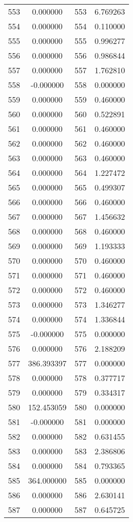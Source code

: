 \documentclass[12pt]{article}
\begin{document}
\begin{longtable}{@{}cccc@{}}
553 & 0.000000 & 553 & 6.769263 \\
554 & 0.000000 & 554 & 0.110000 \\
555 & 0.000000 & 555 & 0.996277 \\
556 & 0.000000 & 556 & 0.986844 \\
557 & 0.000000 & 557 & 1.762810 \\
558 & -0.000000 & 558 & 0.000000 \\
559 & 0.000000 & 559 & 0.460000 \\
560 & 0.000000 & 560 & 0.522891 \\
561 & 0.000000 & 561 & 0.460000 \\
562 & 0.000000 & 562 & 0.460000 \\
563 & 0.000000 & 563 & 0.460000 \\
564 & 0.000000 & 564 & 1.227472 \\
565 & 0.000000 & 565 & 0.499307 \\
566 & 0.000000 & 566 & 0.460000 \\
567 & 0.000000 & 567 & 1.456632 \\
568 & 0.000000 & 568 & 0.460000 \\
569 & 0.000000 & 569 & 1.193333 \\
570 & 0.000000 & 570 & 0.460000 \\
571 & 0.000000 & 571 & 0.460000 \\
572 & 0.000000 & 572 & 0.460000 \\
573 & 0.000000 & 573 & 1.346277 \\
574 & 0.000000 & 574 & 1.336844 \\
575 & -0.000000 & 575 & 0.000000 \\
576 & 0.000000 & 576 & 2.188209 \\
577 & 386.393397 & 577 & 0.000000 \\
578 & 0.000000 & 578 & 0.377717 \\
579 & 0.000000 & 579 & 0.334317 \\
580 & 152.453059 & 580 & 0.000000 \\
581 & -0.000000 & 581 & 0.000000 \\
582 & 0.000000 & 582 & 0.631455 \\
583 & 0.000000 & 583 & 2.386806 \\
584 & 0.000000 & 584 & 0.793365 \\
585 & 364.000000 & 585 & 0.000000 \\
586 & 0.000000 & 586 & 2.630141 \\
587 & 0.000000 & 587 & 0.645725 \\

\end{longtable}
\end{document}
